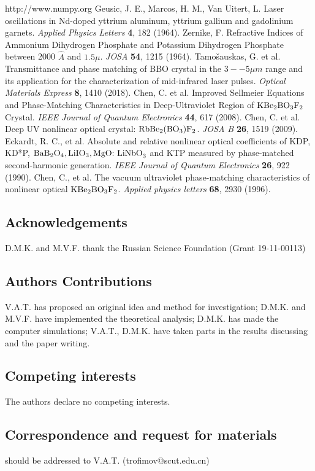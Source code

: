 \documentclass[a4paper, 12pt, onecolumn]{extarticle}
\begin{document}
\begin{thebibliography}{0}
\makeatletter
\addtocounter{\@listctr}{33}
\makeatother
{} http://www.numpy.org
 Geusic, J. E., Marcos, H. M., Van Uitert, L. Laser oscillations in Nd-doped yttrium aluminum, yttrium gallium and gadolinium garnets. \textit{Applied Physics Letters} \textbf{4}, 182 (1964).
 Zernike, F.  Refractive Indices of Ammonium Dihydrogen Phosphate and Potassium Dihydrogen Phosphate between 2000 $\hat{A}$ and $1.5\mu$. \textit{JOSA} \textbf{54}, 1215 (1964).
 Tamo\v{s}auskas, G. et al. Transmittance and phase matching of BBO crystal in the \(3 -- 5 \mu m\) range and its application for the characterization of mid-infrared laser pulses. \textit{Optical Materials Express} \textbf{8}, 1410 (2018).
 Chen, C. et al. Improved Sellmeier Equations and Phase-Matching Characteristics in Deep-Ultraviolet Region of ${\hbox {KBe}} _ {2}{\hbox {BO}} _ {3}{\hbox {F}} _ {2} $ Crystal. \textit{IEEE Journal of Quantum Electronics} \textbf{44}, 617 (2008).
 Chen, C. et al. Deep UV nonlinear optical crystal: $\hbox{RbBe}_2(\hbox{BO}_3)\hbox{F}_2$. \textit{JOSA B} \textbf{26}, 1519 (2009).
 Eckardt, R. C., et al. Absolute and relative nonlinear optical coefficients of KDP, KD*P, $\hbox{BaB}_2\hbox{O}_4, \hbox{LiIO}_3, \hbox{MgO: LiNbO}_3$ and KTP measured by phase-matched second-harmonic generation. \textit{IEEE Journal of Quantum Electronics} \textbf{26}, 922 (1990).
 Chen, C., et al. The vacuum ultraviolet phase-matching characteristics of nonlinear optical ${\hbox {KBe}} _ {2}{\hbox {BO}} _ {3}{\hbox {F}} _ {2} $. \textit{Applied physics letters} \textbf{68}, 2930 (1996).
\end{thebibliography}


\subsection*{Acknowledgements}
D.M.K. and M.V.F. thank the Russian Science Foundation (Grant 19-11-00113)

\subsection*{Authors Contributions}
V.A.T. has proposed an original idea and method for investigation; D.M.K. and M.V.F. have implemented the theoretical analysis; D.M.K. has made the computer simulations; V.A.T., D.M.K. have taken parts in the results discussing and the paper writing.

\subsection*{Competing interests}
The authors declare no competing interests.

\subsection*{Correspondence and request for materials}
should be addressed to V.A.T. (trofimov@scut.edu.cn)
\end{document}
